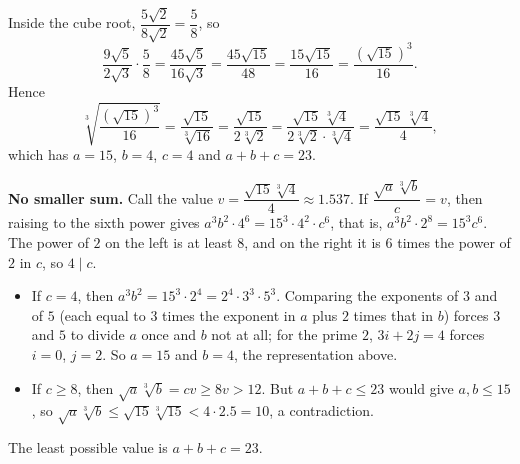 Inside the cube root, $\dfrac{5\sqrt2}{8\sqrt2}=\dfrac58$, so
\[\dfrac{9\sqrt5}{2\sqrt3}\cdot\dfrac58=\dfrac{45\sqrt5}{16\sqrt3}=\dfrac{45\sqrt{15}}{48}=\dfrac{15\sqrt{15}}{16}=\dfrac{\left(\sqrt{15}\right)^3}{16}.\]
Hence
\[\sqrt[3]{\dfrac{\left(\sqrt{15}\right)^3}{16}}=\dfrac{\sqrt{15}}{\sqrt[3]{16}}=\dfrac{\sqrt{15}}{2\sqrt[3]2}=\dfrac{\sqrt{15}\,\sqrt[3]4}{2\sqrt[3]2\cdot\sqrt[3]4}=\dfrac{\sqrt{15}\,\sqrt[3]4}{4},\]
which has $a=15$, $b=4$, $c=4$ and $a+b+c=23$.

\textbf{No smaller sum.} Call the value $v=\dfrac{\sqrt{15}\sqrt[3]4}{4}\approx1.537$. If $\dfrac{\sqrt a\sqrt[3]b}{c}=v$, then raising to the sixth power gives $a^3b^2\cdot4^6=15^3\cdot4^2\cdot c^6$, that is, $a^3b^2\cdot2^8=15^3c^6$. The power of $2$ on the left is at least $8$, and on the right it is $6$ times the power of $2$ in $c$, so $4\mid c$.
\begin{itemize}
\item If $c=4$, then $a^3b^2=15^3\cdot2^4=2^4\cdot3^3\cdot5^3$. Comparing the exponents of $3$ and of $5$ (each equal to $3$ times the exponent in $a$ plus $2$ times that in $b$) forces $3$ and $5$ to divide $a$ once and $b$ not at all; for the prime $2$, $3i+2j=4$ forces $i=0$, $j=2$. So $a=15$ and $b=4$, the representation above.
\item If $c\ge8$, then $\sqrt a\sqrt[3]b=cv\ge8v>12$. But $a+b+c\le23$ would give $a,b\le15$, so $\sqrt a\sqrt[3]b\le\sqrt{15}\sqrt[3]{15}<4\cdot2.5=10$, a contradiction.
\end{itemize}
The least possible value is $a+b+c=\boxed{23}$.
